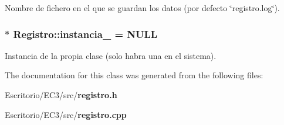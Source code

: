 Nombre de fichero en el que se guardan los datos (por defecto \char`\"{}registro.log\char`\"{}). 

\subsubsection{ $\ast$ {\bf Registro::instancia\_\-} = NULL\hspace{0.3cm}{\tt  [static, private]}}\label{classRegistro_0ea6b1afa36c1cf3fab4169cf6568e58}


Instancia de la propia clase (solo habra una en el sistema). 



The documentation for this class was generated from the following files:\begin{CompactItemize}
\item 
Escritorio/EC3/src/{\bf registro.h}\item 
Escritorio/EC3/src/{\bf registro.cpp}\end{CompactItemize}

